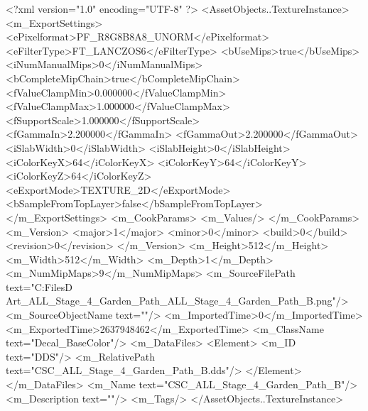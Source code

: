 <?xml version="1.0" encoding="UTF-8" ?>
<AssetObjects..TextureInstance>
	<m_ExportSettings>
		<ePixelformat>PF_R8G8B8A8_UNORM</ePixelformat>
		<eFilterType>FT_LANCZOS6</eFilterType>
		<bUseMips>true</bUseMips>
		<iNumManualMips>0</iNumManualMips>
		<bCompleteMipChain>true</bCompleteMipChain>
		<fValueClampMin>0.000000</fValueClampMin>
		<fValueClampMax>1.000000</fValueClampMax>
		<fSupportScale>1.000000</fSupportScale>
		<fGammaIn>2.200000</fGammaIn>
		<fGammaOut>2.200000</fGammaOut>
		<iSlabWidth>0</iSlabWidth>
		<iSlabHeight>0</iSlabHeight>
		<iColorKeyX>64</iColorKeyX>
		<iColorKeyY>64</iColorKeyY>
		<iColorKeyZ>64</iColorKeyZ>
		<eExportMode>TEXTURE_2D</eExportMode>
		<bSampleFromTopLayer>false</bSampleFromTopLayer>
	</m_ExportSettings>
	<m_CookParams>
		<m_Values/>
	</m_CookParams>
	<m_Version>
		<major>1</major>
		<minor>0</minor>
		<build>0</build>
		<revision>0</revision>
	</m_Version>
	<m_Height>512</m_Height>
	<m_Width>512</m_Width>
	<m_Depth>1</m_Depth>
	<m_NumMipMaps>9</m_NumMipMaps>
	<m_SourceFilePath text="C:\Users\Shadow\Desktop\Working Files\3D Art\Decals\CSC_ALL_Stage_4_Garden_Path\textures\CSC_ALL_Stage_4_Garden_Path_B.png"/>
	<m_SourceObjectName text=""/>
	<m_ImportedTime>0</m_ImportedTime>
	<m_ExportedTime>2637948462</m_ExportedTime>
	<m_ClassName text="Decal_BaseColor"/>
	<m_DataFiles>
		<Element>
			<m_ID text="DDS"/>
			<m_RelativePath text="CSC_ALL_Stage_4_Garden_Path_B.dds"/>
		</Element>
	</m_DataFiles>
	<m_Name text="CSC_ALL_Stage_4_Garden_Path_B"/>
	<m_Description text=""/>
	<m_Tags/>
</AssetObjects..TextureInstance>

